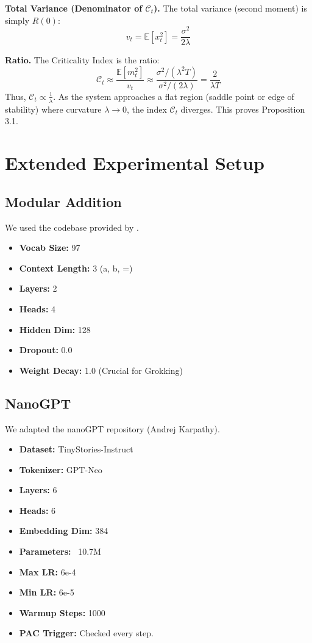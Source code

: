 \documentclass{article}
\theoremstyle{plain}
\theoremstyle{definition}
\theoremstyle{remark}
\newcommand{\C}{\mathcal{C}} %
\begin{document}
\textbf{Total Variance (Denominator of $\C_t$).}
The total variance (second moment) is simply $R(0)$:
\begin{equation}
    v_t = \mathbb{E}[x_t^2] = \frac{\sigma^2}{2\lambda}
\end{equation}

\textbf{Ratio.}
The Criticality Index is the ratio:
\begin{equation}
    \C_t \approx \frac{\mathbb{E}[m_t^2]}{v_t} \approx \frac{\sigma^2 / (\lambda^2 T)}{\sigma^2 / (2\lambda)} = \frac{2}{\lambda T}
\end{equation}
Thus, $\C_t \propto \frac{1}{\lambda}$. As the system approaches a flat region (saddle point or edge of stability) where curvature $\lambda \to 0$, the index $\C_t$ diverges. This proves Proposition 3.1.

\section{Extended Experimental Setup}
\label{app:setup}

\subsection{Modular Addition}
We used the codebase provided by \citet{merrill2024grokfast}.
\begin{itemize}
    \item \textbf{Vocab Size:} 97
    \item \textbf{Context Length:} 3 (a, b, =)
    \item \textbf{Layers:} 2
    \item \textbf{Heads:} 4
    \item \textbf{Hidden Dim:} 128
    \item \textbf{Dropout:} 0.0
    \item \textbf{Weight Decay:} 1.0 (Crucial for Grokking)
\end{itemize}

\subsection{NanoGPT}
We adapted the nanoGPT repository (Andrej Karpathy).
\begin{itemize}
    \item \textbf{Dataset:} TinyStories-Instruct
    \item \textbf{Tokenizer:} GPT-Neo
    \item \textbf{Layers:} 6
    \item \textbf{Heads:} 6
    \item \textbf{Embedding Dim:} 384
    \item \textbf{Parameters:} ~10.7M
    \item \textbf{Max LR:} 6e-4
    \item \textbf{Min LR:} 6e-5
    \item \textbf{Warmup Steps:} 1000
    \item \textbf{PAC Trigger:} Checked every step.
\end{itemize}
\end{document}
